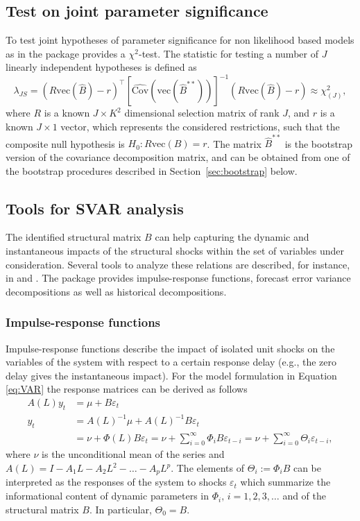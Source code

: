 \documentclass[nojss]{jss}\usepackage[]{graphicx}\usepackage[]{color}
\begin{document}
\subsection{Test on joint parameter significance}
To test joint hypotheses of parameter significance for non likelihood based models as in \cite{HerwartzLDI2018} the package provides a $\chi^2$-test. The statistic for testing a number of $J$ linearly independent hypotheses is defined as
\begin{equation}
\lambda_{JS} = \left(R\mbox{vec}(\widehat{B}) - r\right)^\top\left[\widehat{\mbox{Cov}}\left(\mbox{vec}(\widehat{B}^{**})\right)\right]^{-1}\left(R\mbox{vec}(\widehat{B}) - r\right) \approx \chi^2_{(J)},
\label{Btest}
\end{equation}
where $R$ is a known $J \times K^2$ dimensional selection matrix of rank $J$, and $r$ is a known $J \times 1$ vector, which represents the considered restrictions, such that the composite null hypothesis is $H_0 : R\mbox{vec}(B) = r$. The matrix $\widehat{B}^{**}$ is the bootstrap version of the covariance decomposition matrix, and can be obtained from one of the bootstrap procedures described in Section~\ref{sec:bootstrap} below.

\subsection{Tools for SVAR analysis}

The identified structural matrix $B$ can help capturing the dynamic and instantaneous impacts of the structural shocks within the set of variables under consideration. Several tools to analyze these relations are described, for instance, in \cite{LK17} and \cite{Lkp11}. The  package provides impulse-response functions, forecast error variance decompositions as well as historical decompositions.

\subsubsection*{Impulse-response functions}
Impulse-response functions describe the impact of isolated unit shocks on the variables of the system with respect to a certain response delay (e.g., the zero delay gives the instantaneous impact).  For the model formulation in Equation \ref{eq:VAR} the response matrices can be derived as follows \citep[see, e.g.,][]{IntroductionMultipleTS}
\begin{align*}
A(L)y_t&= \mu + B\varepsilon_t\\
y_t&=A(L)^{-1}\mu+A(L)^{-1}B\varepsilon_t\\
&=\nu+\Phi(L)B\varepsilon_t=\nu+\sum_{i=0}^{\infty}\Phi_{i}B\varepsilon_{t-i}=\nu+\sum_{i=0}^{\infty}\Theta_{i}\varepsilon_{t-i},
\end{align*}
where $\nu$ is the unconditional mean of the series and $A(L)=I-A_1L-A_2L^2-\ldots-A_pL^p$. The elements of $\Theta_i:=\Phi_iB$ can be interpreted as the responses of the system to shocks $\varepsilon_t$ which summarize the informational content of  dynamic parameters in $\Phi_i,\,i=1,2,3,\ldots$ and of the  structural matrix $B$. In particular, $\Theta_0=B$.
\end{document}
